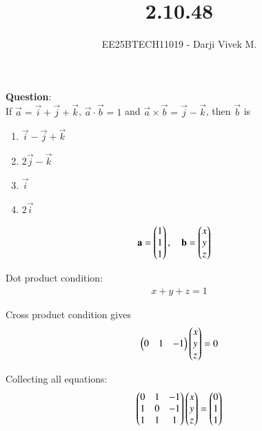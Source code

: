 \documentclass[journal]{IEEEtran}
\begin{document}


\title{2.10.48}
\author{EE25BTECH11019 - Darji Vivek M.}
{\let\newpage\relax\maketitle}

\renewcommand{\thefigure}{\theenumi}
\renewcommand{\thetable}{\theenumi}
\setlength{\intextsep}{10pt}
\renewcommand{\thetable}{\theenumi}

\textbf{Question}:\\
If $\vec{a} = \vec{i}+\vec{j}+\vec{k}$, $\vec{a}\cdot\vec{b}=1$ and $\vec{a}\times\vec{b}=\vec{j}-\vec{k}$, then $\vec{b}$ is  

\begin{multicols}{2}
\begin{enumerate}[label=(\alph*)]
\item $\vec{i}-\vec{j}+\vec{k}$  
\item $2\vec{j}-\vec{k}$  
\item $\vec{i}$  
\item $2\vec{i}$  
\end{enumerate}
\end{multicols}  

\solution  

\begin{align}
\mathbf{a} &= \begin{pmatrix}1\\1\\1\end{pmatrix}, \quad 
\mathbf{b} = \begin{pmatrix}x\\y\\z\end{pmatrix}
\end{align}

Dot product condition:
\begin{align}
x+y+z=1
\end{align}

Cross product condition gives
\begin{align}
\begin{pmatrix}0 & 1 & -1\end{pmatrix}\begin{pmatrix}x\\y\\z\end{pmatrix}=0
\end{align}

Collecting all equations:
\begin{align}
\begin{pmatrix}0 & 1 & -1\\ 1 & 0 & -1\\ 1 & 1 & 1\end{pmatrix}\begin{pmatrix}x\\y\\z\end{pmatrix}=\begin{pmatrix}0\\1\\1\end{pmatrix}
\end{align}
\end{document}

